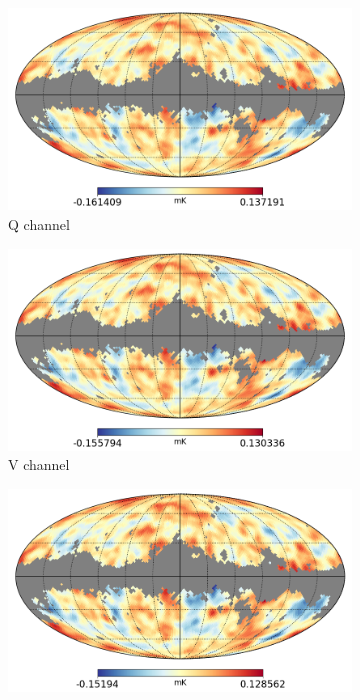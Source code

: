 \documentclass[openany,a4paper,12pt,oneside]{book}
\begin{document}
\begin{spacing}{1.5}
\begin{figure}[!htb]
     \centering
     \begin{subfigure}[b]{0.49\textwidth}
         \centering
         \includegraphics[width=\textwidth]{Imagens/wmap_Q_wmask.png}
         \caption{Q channel}
         \label{fig:Qchannel}
     \end{subfigure}
     \hfill
     \begin{subfigure}[b]{0.49\textwidth}
         \centering
         \includegraphics[width=\textwidth]{Imagens/wmap_V_wmask.png}
         \caption{V channel}
         \label{fig:Vchannel}
     \end{subfigure}
     \hfill
     \begin{subfigure}[b]{0.49\textwidth}
         \centering
         \includegraphics[width=\textwidth]{Imagens/wmap_W_wmask.png}

\end{subfigure}
\end{figure}
\end{spacing}
\end{document}
